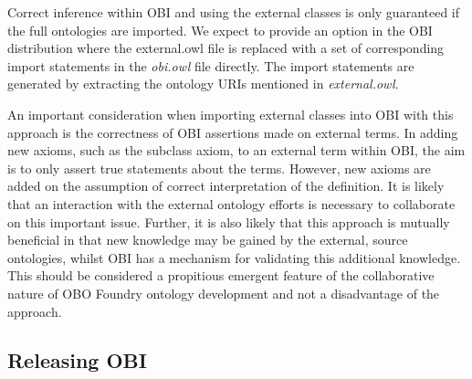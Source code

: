 \documentclass{elsart}       %
\begin{document}
Correct inference within OBI and using the external classes is only guaranteed if the full ontologies are imported.
We expect to provide an option in the OBI distribution where the external.owl file is replaced with a set of corresponding import statements in the \textit{obi.owl} file directly. 
The import statements are generated by extracting the ontology URIs mentioned in \emph{external.owl}. 

An important consideration when importing external classes into OBI with this approach is the correctness of OBI assertions made on external terms.
In adding new axioms, such as the subclass axiom, to an external term within OBI, the aim is to only assert true statements about the terms.
However, new axioms are added on the assumption of correct interpretation of the definition.
It is likely that an interaction with the external ontology efforts is necessary to collaborate on this important issue. Further, it is also likely that this approach is mutually beneficial in that new knowledge may be gained by the external, source ontologies, whilst OBI has a mechanism for validating this additional knowledge. This should be considered a propitious emergent feature of the collaborative nature of OBO Foundry ontology development and not a disadvantage of the approach.

\subsection{Releasing OBI}
\end{document}
